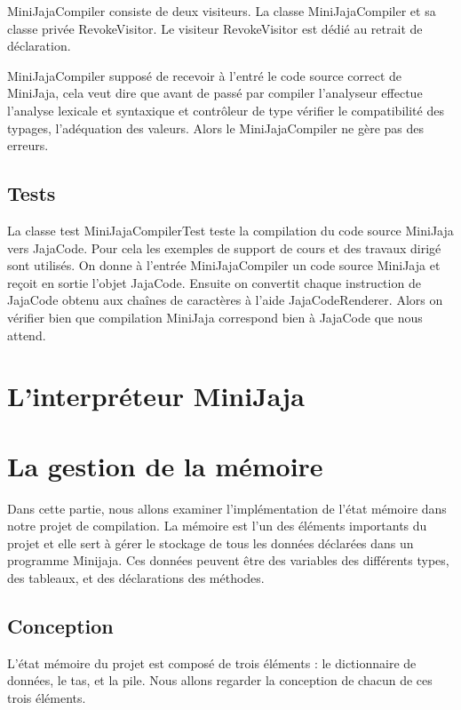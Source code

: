 \documentclass[a4paper,12pt]{report}
\begin{document}
MiniJajaCompiler consiste de deux visiteurs. La classe MiniJajaCompiler et sa classe privée  RevokeVisitor. Le visiteur RevokeVisitor est dédié au  retrait de déclaration. 

MiniJajaCompiler supposé de recevoir à l’entré le code source correct de MiniJaja, cela veut dire que avant de passé par compiler l’analyseur effectue l’analyse lexicale et syntaxique et contrôleur de type vérifier le compatibilité des typages, l’adéquation des valeurs. Alors le MiniJajaCompiler ne gère pas des erreurs. 

\subsection{Tests}
La classe test MiniJajaCompilerTest teste la compilation du code source MiniJaja vers JajaCode. Pour cela les exemples de support de cours et des travaux dirigé sont utilisés.  On donne à l’entrée MiniJajaCompiler un code source MiniJaja et reçoit en sortie l’objet JajaCode.  Ensuite on convertit chaque instruction de JajaCode obtenu aux chaînes de caractères à l’aide JajaCodeRenderer. Alors on vérifier bien que compilation MiniJaja correspond bien à JajaCode que nous attend. 


\section{L'interpréteur MiniJaja}
\paragraph{}


\section{La gestion de la mémoire}
Dans cette partie, nous allons examiner l'implémentation de l'état mémoire dans notre projet de compilation. La mémoire est l'un des éléments importants du projet et elle sert à gérer le stockage de tous les données déclarées dans un programme Minijaja. Ces données peuvent être des variables des différents types, des tableaux, et des déclarations des méthodes. 

\subsection{Conception}
L'état mémoire du projet est composé de trois éléments : le dictionnaire de données, le tas, et la pile. Nous allons regarder la conception de chacun de ces trois éléments.
\end{document}
